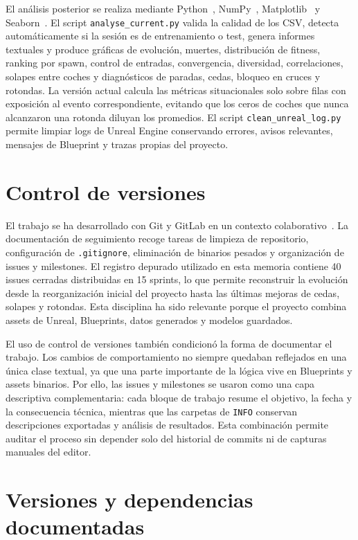 El análisis posterior se realiza mediante Python~\cite{python}, NumPy~\cite{numpy}, Matplotlib~\cite{matplotlib} y Seaborn~\cite{seaborn}. El script \texttt{analyse\_current.py} valida la calidad de los CSV, detecta automáticamente si la sesión es de entrenamiento o test, genera informes textuales y produce gráficas de evolución, muertes, distribución de fitness, ranking por spawn, control de entradas, convergencia, diversidad, correlaciones, solapes entre coches y diagnósticos de paradas, cedas, bloqueo en cruces y rotondas. La versión actual calcula las métricas situacionales solo sobre filas con exposición al evento correspondiente, evitando que los ceros de coches que nunca alcanzaron una rotonda diluyan los promedios. El script \texttt{clean\_unreal\_log.py} permite limpiar logs de Unreal Engine conservando errores, avisos relevantes, mensajes de Blueprint y trazas propias del proyecto.

\section{Control de versiones}

El trabajo se ha desarrollado con Git y GitLab en un contexto colaborativo~\cite{git,gitlabdocs}. La documentación de seguimiento recoge tareas de limpieza de repositorio, configuración de \texttt{.gitignore}, eliminación de binarios pesados y organización de issues y milestones. El registro depurado utilizado en esta memoria contiene 40 issues cerradas distribuidas en 15 sprints, lo que permite reconstruir la evolución desde la reorganización inicial del proyecto hasta las últimas mejoras de cedas, solapes y rotondas. Esta disciplina ha sido relevante porque el proyecto combina assets de Unreal, Blueprints, datos generados y modelos guardados.

El uso de control de versiones también condicionó la forma de documentar el trabajo. Los cambios de comportamiento no siempre quedaban reflejados en una única clase textual, ya que una parte importante de la lógica vive en Blueprints y assets binarios. Por ello, las issues y milestones se usaron como una capa descriptiva complementaria: cada bloque de trabajo resume el objetivo, la fecha y la consecuencia técnica, mientras que las carpetas de \texttt{INFO} conservan descripciones exportadas y análisis de resultados. Esta combinación permite auditar el proceso sin depender solo del historial de commits ni de capturas manuales del editor.

\section{Versiones y dependencias documentadas}

